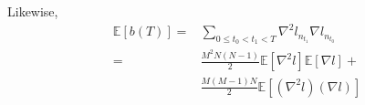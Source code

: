 \documentclass{article}
\newcommand{\expct}[1]{\mathbb{E}\left[#1\right]}
\begin{document}
        Likewise, 
        \begin{align*}
            \expct{b(T)}
            = 
            &\sum_{0\leq t_0 < t_1 < T} \nabla^2 l_{n_{t_1}} \nabla l_{n_{t_0}} \\
            =
            &\frac{M^2N(N-1)}{2} \expct{\nabla^2 l} \expct{\nabla l} + \\
            &\frac{M(M-1)N}{2}  \expct{(\nabla^2 l) (\nabla l)} 
        \end{align*}
\end{document}
